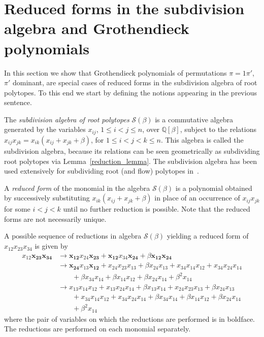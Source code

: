 \documentclass[ALCO,ThmDefs]{cedram}
\numberwithin{equation}{section}
\renewcommand*\t{{\mathcal{S}(\beta)}}
\newcommand*\+{\smash{\lower2pt\hbox{\rlap{\vrule height14pt}}\raise2pt\hbox{\rlap{\hskip-3pt \vrule height.4pt depth0pt width14.7pt}}}}
\begin{document}
\section{Reduced forms in the subdivision algebra and Grothendieck polynomials}\label{sec:groth}

In this section we show that Grothendieck polynomials of permutations $\pi=1\pi'$, $\pi'$ dominant, are special cases of reduced forms in the subdivision algebra of root polytopes. To this end we start by defining the notions appearing in the previous sentence.

The \emph{subdivision algebra of root polytopes} $\t$ is a commutative algebra generated by the variables $x_{ij}$, $1\leq i<j\leq n$, over $\mathbb{Q}[\beta]$, subject to the relations $x_{ij} x_{jk}=x_{ik}(x_{ij}+x_{jk}+\beta)$, for $1\leq i<j<k\leq n$. This algebra is called the subdivision algebra, because its relations can be seen geometrically as subdividing root polytopes via Lemma~\ref{reduction_lemma}. The subdivision algebra has been used extensively for subdividing root (and flow) polytopes in~\cite{root1, root2, h-poly1, prod, h-poly2, groth, mm}.

A \emph{reduced form} of the monomial in the algebra $\t$ is a polynomial obtained by successively substituting $x_{ik}(x_{ij}+x_{jk}+\beta)$ in place of an occurrence of $x_{ij} x_{jk}$ for some $i<j<k$ until no further reduction is possible. Note that the reduced forms are not necessarily unique.

A possible sequence of reductions in algebra $\t$ yielding a reduced form of $x_{12}x_{23}x_{34}$ is given by
\begin{equation}
\begin{aligned}\label{ex1}
x_{12} \boldsymbol{x_{23}x_{34}} & \rightarrow \boldsymbol{x_{12}}x_{24}\boldsymbol{x_{23}}+\boldsymbol{x_{12}}x_{34}\boldsymbol{x_{24}}+\beta \boldsymbol{x_{12}x_{24}}  \\
& \rightarrow  \boldsymbol{x_{24}} x_{13} \boldsymbol{x_{12}}+x_{24}x_{23}x_{13}+ \beta x_{24}x_{13}+x_{34}x_{14}x_{12}+x_{34}x_{24}x_{14}  \\
& \qquad+\beta x_{34}x_{14}+\beta x_{14}x_{12}+\beta x_{24}x_{14}+\beta^2 x_{14}  \\
& \rightarrow x_{13}x_{14}x_{12}+x_{13}x_{24}x_{14}+\beta x_{13}x_{14}+x_{24}x_{23}x_{13}+\beta x_{24}x_{13} \\
& \qquad+x_{34}x_{14}x_{12}+x_{34}x_{24}x_{14}+\beta x_{34}x_{14}+\beta x_{14}x_{12}+\beta x_{24}x_{14} \\
& \qquad+\beta^2 x_{14}
\end{aligned}
\end{equation}
where the pair of variables on which the reductions are performed is in boldface. The reductions are performed on each monomial separately.
\end{document}
